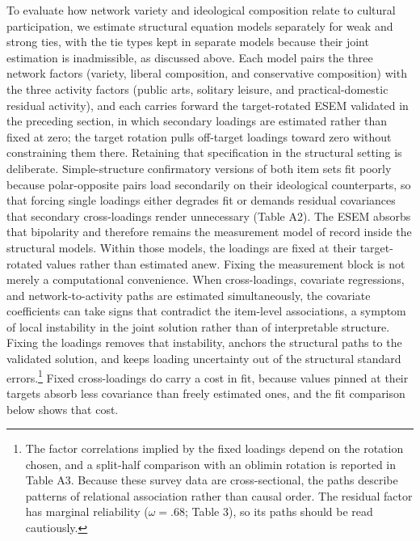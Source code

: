 \documentclass[
  12pt
]{article}
\begin{document}
To evaluate how network variety and ideological composition relate to cultural participation, we estimate structural equation models separately for weak and strong ties, with the tie types kept in separate models because their joint estimation is inadmissible, as discussed above. Each model pairs the three network factors (variety, liberal composition, and conservative composition) with the three activity factors (public arts, solitary leisure, and practical-domestic residual activity), and each carries forward the target-rotated ESEM validated in the preceding section, in which secondary loadings are estimated rather than fixed at zero; the target rotation pulls off-target loadings toward zero without constraining them there. Retaining that specification in the structural setting is deliberate. Simple-structure confirmatory versions of both item sets fit poorly because polar-opposite pairs load secondarily on their ideological counterparts, so that forcing single loadings either degrades fit or demands residual covariances that secondary cross-loadings render unnecessary (Table A2). The ESEM absorbs that bipolarity and therefore remains the measurement model of record inside the structural models. Within those models, the loadings are fixed at their target-rotated values rather than estimated anew. Fixing the measurement block is not merely a computational convenience. When cross-loadings, covariate regressions, and network-to-activity paths are estimated simultaneously, the covariate coefficients can take signs that contradict the item-level associations, a symptom of local instability in the joint solution rather than of interpretable structure. Fixing the loadings removes that instability, anchors the structural paths to the validated solution, and keeps loading uncertainty out of the structural standard errors.\footnote{The factor correlations implied by the fixed loadings depend on the rotation chosen, and a split-half comparison with an oblimin rotation is reported in Table A3. Because these survey data are cross-sectional, the paths describe patterns of relational association rather than causal order. The residual factor has marginal reliability ($\omega = .68$; Table 3), so its paths should be read cautiously.} Fixed cross-loadings do carry a cost in fit, because values pinned at their targets absorb less covariance than freely estimated ones, and the fit comparison below shows that cost.
\end{document}
